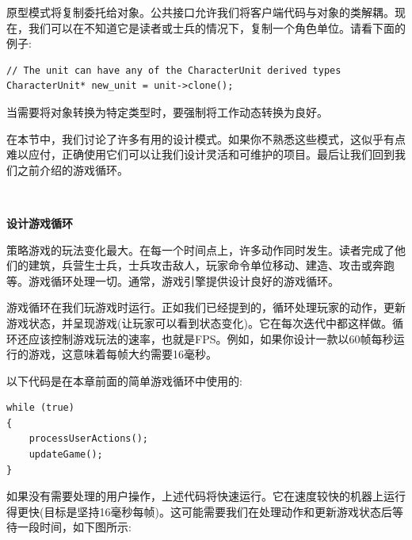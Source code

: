 原型模式将复制委托给对象。公共接口允许我们将客户端代码与对象的类解耦。现在，我们可以在不知道它是读者或士兵的情况下，复制一个角色单位。请看下面的例子: \par

\begin{lstlisting}[caption={}]
// The unit can have any of the CharacterUnit derived types
CharacterUnit* new_unit = unit->clone();
\end{lstlisting}

当需要将对象转换为特定类型时，要强制将工作动态转换为良好。 \par
在本节中，我们讨论了许多有用的设计模式。如果你不熟悉这些模式，这似乎有点难以应付，正确使用它们可以让我们设计灵活和可维护的项目。最后让我们回到我们之前介绍的游戏循环。 \par

\noindent\textbf{}\ \par
\textbf{设计游戏循环} \ \par
策略游戏的玩法变化最大。在每一个时间点上，许多动作同时发生。读者完成了他们的建筑，兵营生士兵，士兵攻击敌人，玩家命令单位移动、建造、攻击或奔跑等。游戏循环处理一切。通常，游戏引擎提供设计良好的游戏循环。 \par
游戏循环在我们玩游戏时运行。正如我们已经提到的，循环处理玩家的动作，更新游戏状态，并呈现游戏(让玩家可以看到状态变化)。它在每次迭代中都这样做。循环还应该控制游戏玩法的速率，也就是FPS。例如，如果你设计一款以60帧每秒运行的游戏，这意味着每帧大约需要16毫秒。 \par
以下代码是在本章前面的简单游戏循环中使用的: \par

\begin{lstlisting}[caption={}]
while (true)
{
	processUserActions();
	updateGame();
}
\end{lstlisting}

如果没有需要处理的用户操作，上述代码将快速运行。它在速度较快的机器上运行得更快(目标是坚持16毫秒每帧)。这可能需要我们在处理动作和更新游戏状态后等待一段时间，如下图所示: \par

